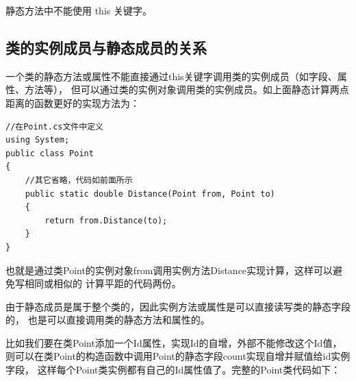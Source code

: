 静态方法中不能使用 this 关键字。


\subsection{类的实例成员与静态成员的关系}

一个类的静态方法或属性不能直接通过this关键字调用类的实例成员（如字段、属性、方法等），
但可以通过类的实例对象调用类的实例成员。如上面静态计算两点距离的函数更好的实现方法为：

\begin{lstlisting}
//在Point.cs文件中定义
using System;
public class Point
{ 
    //其它省略，代码如前面所示
    public static double Distance(Point from, Point to)
    {      
        return from.Distance(to);
    }
}
\end{lstlisting}

也就是通过类Point的实例对象from调用实例方法Distance实现计算，这样可以避免写相同或相似的
计算平距的代码两份。

由于静态成员是属于整个类的，因此实例方法或属性是可以直接读写类的静态字段的，
也是可以直接调用类的静态方法和属性的。

比如我们要在类Point添加一个Id属性，实现Id的自增，外部不能修改这个Id值，
则可以在类Point的构造函数中调用Point的静态字段count实现自增并赋值给id实例字段，
这样每个Point类实例都有自己的Id属性值了。完整的Point类代码如下：

